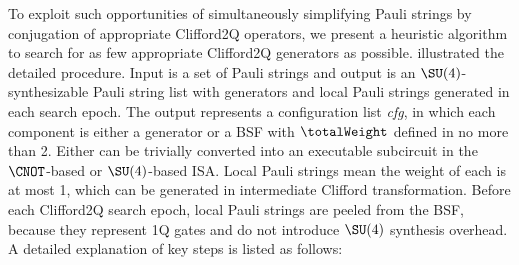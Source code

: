 To exploit such opportunities of simultaneously simplifying Pauli strings by conjugation of appropriate Clifford2Q operators, we present a heuristic algorithm to search for as few appropriate Clifford2Q generators as possible.  illustrated the detailed procedure. Input is a set of Pauli strings and output is an $\SU(4)$-synthesizable Pauli string list with generators and local Pauli strings generated in each search epoch. %
The output represents a configuration list \textit{cfg}, in which each component is either a generator or a BSF with $\totalWeight$ defined in  no more than 2. Either can be trivially converted into an executable subcircuit in the $\CNOT$-based or $\SU(4)$-based ISA. Local Pauli strings mean the weight of each is at most 1, which can be generated in intermediate Clifford transformation. Before each 
Clifford2Q search epoch, local Pauli strings are peeled from the BSF, because they represent 1Q gates and do not introduce $\SU(4)$ synthesis overhead. A detailed explanation of key steps is listed as follows:
